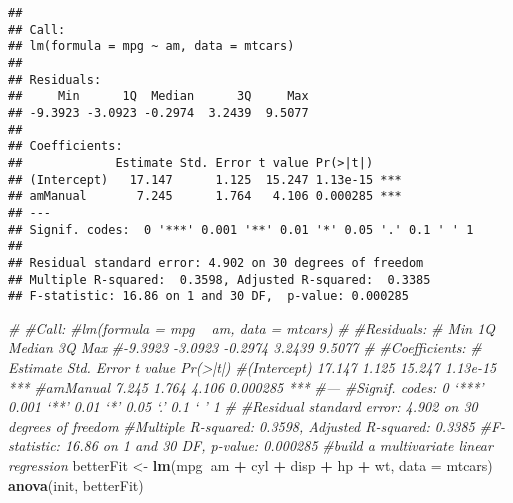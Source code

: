 \documentclass[]{article}
\newenvironment{Shaded}{\begin{snugshade}}{\end{snugshade}}
\newcommand{\KeywordTok}[1]{\textcolor[rgb]{0.13,0.29,0.53}{\textbf{#1}}}
\newcommand{\DataTypeTok}[1]{\textcolor[rgb]{0.13,0.29,0.53}{#1}}
\newcommand{\StringTok}[1]{\textcolor[rgb]{0.31,0.60,0.02}{#1}}
\newcommand{\CommentTok}[1]{\textcolor[rgb]{0.56,0.35,0.01}{\textit{#1}}}
\newcommand{\OperatorTok}[1]{\textcolor[rgb]{0.81,0.36,0.00}{\textbf{#1}}}
\newcommand{\NormalTok}[1]{#1}
\begin{document}
\begin{Shaded}
\end{Shaded}

\begin{verbatim}
## 
## Call:
## lm(formula = mpg ~ am, data = mtcars)
## 
## Residuals:
##     Min      1Q  Median      3Q     Max 
## -9.3923 -3.0923 -0.2974  3.2439  9.5077 
## 
## Coefficients:
##             Estimate Std. Error t value Pr(>|t|)    
## (Intercept)   17.147      1.125  15.247 1.13e-15 ***
## amManual       7.245      1.764   4.106 0.000285 ***
## ---
## Signif. codes:  0 '***' 0.001 '**' 0.01 '*' 0.05 '.' 0.1 ' ' 1
## 
## Residual standard error: 4.902 on 30 degrees of freedom
## Multiple R-squared:  0.3598, Adjusted R-squared:  0.3385 
## F-statistic: 16.86 on 1 and 30 DF,  p-value: 0.000285
\end{verbatim}

\begin{Shaded}
\begin{Highlighting}[]
\CommentTok{#}
\CommentTok{#Call:}
\CommentTok{#lm(formula = mpg ~ am, data = mtcars)}
\CommentTok{#}
\CommentTok{#Residuals:}
\CommentTok{#    Min      1Q  Median      3Q     Max }
\CommentTok{#-9.3923 -3.0923 -0.2974  3.2439  9.5077 }
\CommentTok{#}
\CommentTok{#Coefficients:}
\CommentTok{#            Estimate Std. Error t value Pr(>|t|)    }
\CommentTok{#(Intercept)   17.147      1.125  15.247 1.13e-15 ***}
\CommentTok{#amManual       7.245      1.764   4.106 0.000285 ***}
\CommentTok{#---}
\CommentTok{#Signif. codes:  0 ‘***’ 0.001 ‘**’ 0.01 ‘*’ 0.05 ‘.’ 0.1 ‘ ’ 1}
\CommentTok{#}
\CommentTok{#Residual standard error: 4.902 on 30 degrees of freedom}
\CommentTok{#Multiple R-squared:  0.3598,   Adjusted R-squared:  0.3385 }
\CommentTok{#F-statistic: 16.86 on 1 and 30 DF,  p-value: 0.000285}
\CommentTok{#build a multivariate linear regression}
\NormalTok{betterFit <-}\StringTok{ }\KeywordTok{lm}\NormalTok{(mpg}\OperatorTok{~}\NormalTok{am }\OperatorTok{+}\StringTok{ }\NormalTok{cyl }\OperatorTok{+}\StringTok{ }\NormalTok{disp }\OperatorTok{+}\StringTok{ }\NormalTok{hp }\OperatorTok{+}\StringTok{ }\NormalTok{wt, }\DataTypeTok{data =}\NormalTok{ mtcars)}
\KeywordTok{anova}\NormalTok{(init, betterFit)}
\end{Highlighting}
\end{Shaded}
\end{document}
